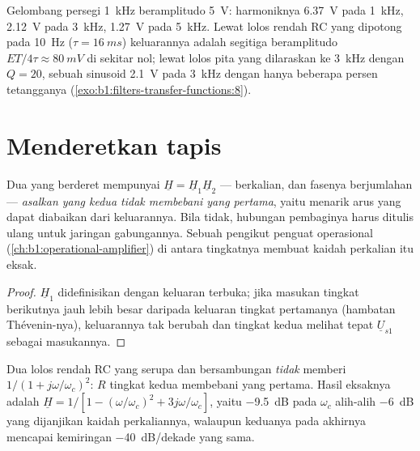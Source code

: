 \begin{example}\label{ex:b1:filters-transfer-functions:numbers}
Gelombang persegi \qty{1}{kHz} beramplitudo \qty{5}{V}: harmoniknya
\qty{6.37}{V} pada \qty{1}{kHz}, \qty{2.12}{V} pada \qty{3}{kHz},
\qty{1.27}{V} pada \qty{5}{kHz}. Lewat lolos rendah RC yang dipotong
pada \qty{10}{Hz} ($\tau = \qty{16}{ms}$) keluarannya adalah segitiga
beramplitudo $ET/4\tau \approx \qty{80}{mV}$ di sekitar nol; lewat
lolos pita yang dilaraskan ke \qty{3}{kHz} dengan $Q = 20$, sebuah
sinusoid \qty{2.1}{V} pada \qty{3}{kHz} dengan hanya beberapa persen
tetangganya (\cref{exo:b1:filters-transfer-functions:8}).
\end{example}

\section{Menderetkan tapis}

\begin{proposition}\label{prop:b1:filters-transfer-functions:cascade}
Dua  yang berderet mempunyai $\underline H = \underline H_1\underline H_2$
---  berkalian,  dan fasenya berjumlahan ---
\emph{asalkan yang kedua tidak membebani yang pertama}, yaitu menarik
arus yang dapat diabaikan dari keluarannya. Bila tidak, hubungan
pembaginya harus ditulis ulang untuk jaringan gabungannya. Sebuah
pengikut penguat operasional
(\cref{ch:b1:operational-amplifier}) di antara tingkatnya membuat
kaidah perkalian itu eksak.
\end{proposition}

\begin{proof}
$\underline H_1$ didefinisikan dengan keluaran terbuka; jika 
masukan tingkat berikutnya jauh lebih besar daripada  keluaran
tingkat pertamanya (hambatan Thévenin-nya),  keluarannya tak
berubah dan tingkat kedua melihat tepat $\underline U_{s1}$ sebagai masukannya.
\end{proof}

\begin{example}\label{ex:b1:filters-transfer-functions:tworc}
Dua lolos rendah RC yang serupa dan bersambungan \emph{tidak} memberi
$1/(1 + j\omega/\omega_c)^2$: $R$ tingkat kedua membebani yang pertama.
Hasil eksaknya adalah $\underline H = 1/[1 - (\omega/\omega_c)^2 +
3j\omega/\omega_c]$, yaitu \qty{-9.5}{dB} pada $\omega_c$ alih-alih
\qty{-6}{dB} yang dijanjikan kaidah perkaliannya, walaupun keduanya
pada akhirnya mencapai kemiringan \qty{-40}{dB/dekade} yang sama.
\end{example}

